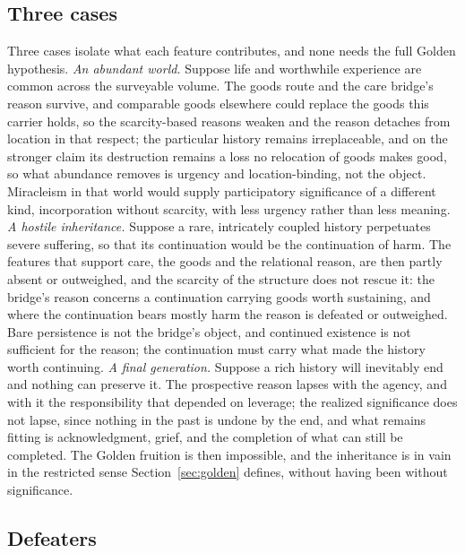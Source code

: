 \subsection*{Three cases}

Three cases isolate what each feature contributes, and none needs the full
Golden hypothesis. \emph{An abundant world.} Suppose life and worthwhile
experience are common across the surveyable volume. The goods route and the
care bridge's reason survive, and comparable goods elsewhere could replace
the goods this carrier holds, so the scarcity-based reasons weaken and the
reason detaches from location in that respect; the particular history remains
irreplaceable, and on the stronger claim its destruction remains a loss no
relocation of goods makes good, so what abundance removes is urgency and
location-binding, not the object. Miracleism in that world would supply participatory
significance of a different kind, incorporation without scarcity, with less
urgency rather than less meaning. \emph{A hostile inheritance.} Suppose a rare, intricately
coupled history perpetuates severe suffering, so that its continuation would be
the continuation of harm. The features that support care, the goods and the
relational reason, are then partly absent or outweighed, and the scarcity of
the structure does not rescue it: the bridge's reason concerns a continuation
carrying goods worth sustaining, and where the continuation bears mostly harm
the reason is defeated or outweighed. Bare persistence is not the bridge's object, and continued
existence is not sufficient for the reason; the continuation must carry what
made the history worth continuing. \emph{A final generation.} Suppose a rich
history will inevitably end and nothing can preserve it. The prospective
reason lapses with the agency, and with it the responsibility that depended on
leverage; the realized significance does not lapse, since nothing in the past
is undone by the end, and what remains fitting is acknowledgment, grief, and
the completion of what can still be completed. The Golden fruition is then
impossible, and the inheritance is in vain in the restricted sense
Section~\ref{sec:golden} defines, without having been without significance.

\subsection*{Defeaters}

